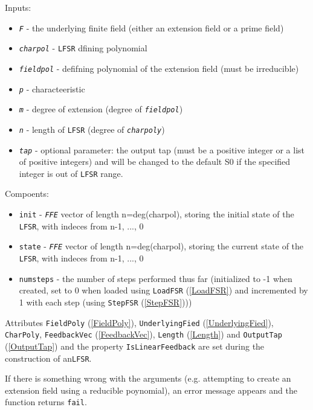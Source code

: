 \documentclass[a4paper,11pt]{report}
\begin{document}
{{{ Inputs: 
\begin{itemize}
\item  \mbox{\texttt{\mdseries\slshape F}} - the underlying finite field (either an extension field or a prime field)
\item  \mbox{\texttt{\mdseries\slshape charpol}} - \texttt{LFSR} dfining polynomial 
\item  \mbox{\texttt{\mdseries\slshape fieldpol}} - defifning polynomial of the extension field (must be irreducible)
\item  \mbox{\texttt{\mdseries\slshape p}} - characteeristic 
\item  \mbox{\texttt{\mdseries\slshape m}} - degree of extension (degree of \mbox{\texttt{\mdseries\slshape fieldpol}}) 
\item  \mbox{\texttt{\mdseries\slshape n}} - length of \texttt{LFSR} (degree of \mbox{\texttt{\mdseries\slshape charpoly}})
\item  \mbox{\texttt{\mdseries\slshape tap}} - optional parameter: the output tap (must be a positive integer or a list of
positive integers) and will be changed to the default S{\textunderscore}0 if
the specified integer is out of \texttt{LFSR} range.
\end{itemize}
 Compoents: 
\begin{itemize}
\item  \texttt{init} - \mbox{\texttt{\mdseries\slshape FFE}} vector of length n=deg(charpol), storing the initial state of the \texttt{LFSR}, with indeces from n-1, ..., 0
\item  \texttt{state} - \mbox{\texttt{\mdseries\slshape FFE}} vector of length n=deg(charpol), storing the current state of the \texttt{LFSR}, with indeces from n-1, ..., 0
\item  \texttt{numsteps} - the number of steps performed thus far (initialized to -1 when created, set
to 0 when loaded using \texttt{LoadFSR} (\ref{LoadFSR}) and incremented by 1 with each step (using \texttt{StepFSR} (\ref{StepFSR}))) 
\end{itemize}
 Attributes \texttt{FieldPoly} (\ref{FieldPoly}), \texttt{UnderlyingFied} (\ref{UnderlyingFied}), \texttt{CharPoly}, \texttt{FeedbackVec} (\ref{FeedbackVec}), \texttt{Length} (\ref{Length}) and \texttt{OutputTap} (\ref{OutputTap}) and the property \texttt{IsLinearFeedback} are set during the construction of an\texttt{LFSR}. 

 If there is something wrong with the arguments (e.g. attempting to create an
extension field using a reducible poynomial), an error message appears and the
function returns \texttt{fail}. }

}}
\end{document}
